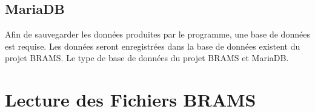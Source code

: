 \documentclass[11pt]{article}
\begin{document}

\subsection{MariaDB}

Afin de sauvegarder les données produites par le programme, une base de données est requise.
Les données seront enregistrées dans la base de données existent du projet BRAMS.
Le type de base de données du projet BRAMS et MariaDB.

\newpage

\section{Lecture des Fichiers BRAMS}
\end{document}
